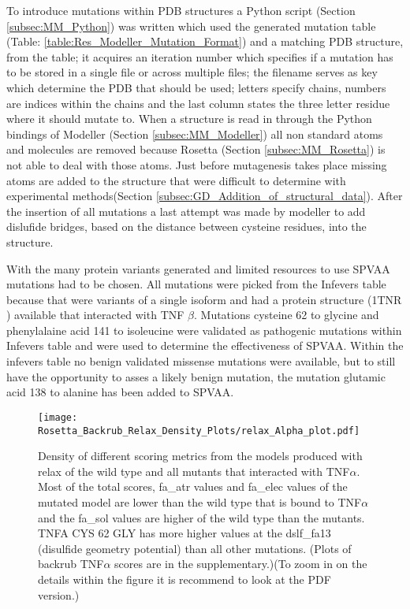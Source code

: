 	To introduce mutations within PDB structures a Python script (Section \ref{subsec:MM_Python}) was written which used the generated mutation table (Table: \ref{table:Res_Modeller_Mutation_Format}) and a matching PDB structure, from the table; it acquires an iteration number which specifies if a mutation has to be stored in a single file or across multiple files; the filename serves as key which determine the PDB that should be used; letters specify chains, numbers are indices within the chains and the last column states the three letter residue where it should mutate to. When a structure is read in through the Python bindings of Modeller (Section \ref{subsec:MM_Modeller}) all non standard atoms and molecules are removed because Rosetta (Section \ref{subsec:MM_Rosetta}) is not able to deal with those atoms. Just before mutagenesis takes place missing atoms are added to the structure that were difficult to determine with experimental methods(Section \ref{subsec:GD_Addition_of_structural_data}). After the insertion of all mutations a last attempt was made by modeller to add dislufide bridges, based on the distance between cysteine residues, into the structure.
	
	With the many protein variants generated and limited resources to use SPVAA mutations had to be chosen. All mutations were picked from the Infevers table because that were variants of a single isoform and had a protein structure (1TNR \cite{banner_crystal_1993}) available that interacted with TNF $\beta$. 
	Mutations cysteine 62 to glycine and phenylalaine acid 141 to isoleucine were validated as pathogenic mutations within Infevers table and were used to determine the effectiveness of SPVAA. Within the infevers table no benign validated missense mutations were available, but to still have the opportunity to asses a likely benign mutation, the mutation glutamic acid 138 to alanine has been added to SPVAA.	
	
	\newpage
	\begin{figure}[!ht]
		\centering
		\texttt{[image: Rosetta\_Backrub\_Relax\_Density\_Plots/relax\_Alpha\_plot.pdf]}
		\caption[TNFRSF1A homotimer with TNF$\alpha$ homotrimer relax score density plots]{Density of different scoring metrics from the models produced with relax of the wild type and all mutants that interacted with TNF$\alpha$. Most of the total scores, fa\_atr values and fa\_elec values of the mutated model are lower than the wild type that is bound to TNF$\alpha$ and the fa\_sol values are higher of the wild type than the mutants. TNFA CYS 62 GLY has more higher values at the dslf\_fa13 (disulfide geometry potential) than all other mutations. (Plots of backrub TNF$\alpha$ scores are in the supplementary.)(To zoom in on the details within the figure it is recommend to look at the PDF version.)}
		\label{fig:relax_TNFA_scores}
	\end{figure}

